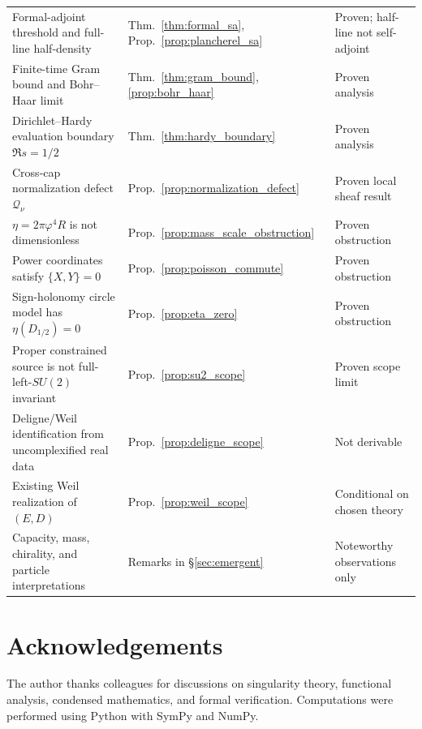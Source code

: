 \documentclass[11pt]{article}
\begin{document}
\begin{longtable}{@{}>{\raggedright\arraybackslash}p{6.0cm}>{\raggedright\arraybackslash}p{2.0cm}>{\raggedright\arraybackslash}p{2.8cm}@{}}
Formal-adjoint threshold and full-line half-density &
Thm.~\ref{thm:formal_sa}, Prop.~\ref{prop:plancherel_sa} &
Proven; half-line not self-adjoint \\
Finite-time Gram bound and Bohr--Haar limit &
Thm.~\ref{thm:gram_bound}, \ref{prop:bohr_haar} & Proven analysis \\
Dirichlet--Hardy evaluation boundary $\Re s=1/2$ &
Thm.~\ref{thm:hardy_boundary} & Proven analysis \\
Cross-cap normalization defect $\mathcal Q_\nu$ &
Prop.~\ref{prop:normalization_defect} & Proven local sheaf result \\
$\eta=2\pi\varphi^4R$ is not dimensionless &
Prop.~\ref{prop:mass_scale_obstruction} & Proven obstruction \\
Power coordinates satisfy $\{X,Y\}=0$ &
Prop.~\ref{prop:poisson_commute} & Proven obstruction \\
Sign-holonomy circle model has $\eta(D_{1/2})=0$ &
Prop.~\ref{prop:eta_zero} & Proven obstruction \\
Proper constrained source is not full-left-$SU(2)$ invariant &
Prop.~\ref{prop:su2_scope} & Proven scope limit \\
Deligne/Weil identification from uncomplexified real data &
Prop.~\ref{prop:deligne_scope} & Not derivable \\
Existing Weil realization of $(E,D)$ &
Prop.~\ref{prop:weil_scope} & Conditional on chosen theory \\
Capacity, mass, chirality, and particle interpretations &
Remarks in \S\ref{sec:emergent} & Noteworthy observations only \\
\bottomrule
\end{longtable}
\normalsize

\section*{Acknowledgements}
The author thanks colleagues for discussions on singularity theory, functional
analysis, condensed mathematics, and formal verification.
Computations were performed using Python with SymPy and NumPy.
\end{document}
